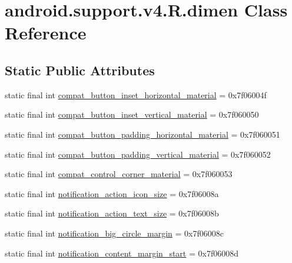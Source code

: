\hypertarget{classandroid_1_1support_1_1v4_1_1R_1_1dimen}{}\section{android.\+support.\+v4.\+R.\+dimen Class Reference}
\label{classandroid_1_1support_1_1v4_1_1R_1_1dimen}
\subsection*{Static Public Attributes}
\begin{DoxyCompactItemize}
\item 
static final int \mbox{\hyperlink{classandroid_1_1support_1_1v4_1_1R_1_1dimen_a749391e761d0b1564eb37a58de4a1128}{compat\+\_\+button\+\_\+inset\+\_\+horizontal\+\_\+material}} = 0x7f06004f
\item 
static final int \mbox{\hyperlink{classandroid_1_1support_1_1v4_1_1R_1_1dimen_ab5f86549d65734fbdbc02b8f1c81db39}{compat\+\_\+button\+\_\+inset\+\_\+vertical\+\_\+material}} = 0x7f060050
\item 
static final int \mbox{\hyperlink{classandroid_1_1support_1_1v4_1_1R_1_1dimen_a7f2032620e486738d418b0285c20b0ba}{compat\+\_\+button\+\_\+padding\+\_\+horizontal\+\_\+material}} = 0x7f060051
\item 
static final int \mbox{\hyperlink{classandroid_1_1support_1_1v4_1_1R_1_1dimen_a1ceba4dabb3ee62a287c026812771b4d}{compat\+\_\+button\+\_\+padding\+\_\+vertical\+\_\+material}} = 0x7f060052
\item 
static final int \mbox{\hyperlink{classandroid_1_1support_1_1v4_1_1R_1_1dimen_a5eabb5cd9f1fbb7332bd3e79ff77ff21}{compat\+\_\+control\+\_\+corner\+\_\+material}} = 0x7f060053
\item 
static final int \mbox{\hyperlink{classandroid_1_1support_1_1v4_1_1R_1_1dimen_a01ca2c6621abec7453a1df3e82fe49e0}{notification\+\_\+action\+\_\+icon\+\_\+size}} = 0x7f06008a
\item 
static final int \mbox{\hyperlink{classandroid_1_1support_1_1v4_1_1R_1_1dimen_a2437e1695b66799f1b8dbd9bcaaa3358}{notification\+\_\+action\+\_\+text\+\_\+size}} = 0x7f06008b
\item 
static final int \mbox{\hyperlink{classandroid_1_1support_1_1v4_1_1R_1_1dimen_add847f3ee1febaf2e1d0b768b9331a21}{notification\+\_\+big\+\_\+circle\+\_\+margin}} = 0x7f06008c
\item 
static final int \mbox{\hyperlink{classandroid_1_1support_1_1v4_1_1R_1_1dimen_a7f76fd4e1d58ff4c219acf0925261870}{notification\+\_\+content\+\_\+margin\+\_\+start}} = 0x7f06008d

\end{DoxyCompactItemize}
